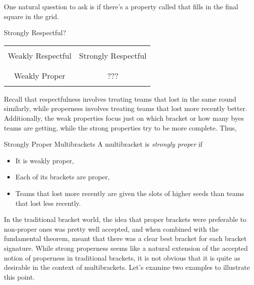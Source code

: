{    One natural question to ask is if there's a property called that fills in the final square in the grid.

    \begin{figg}{Strongly Respectful?}{}
        \begin{center}
            \begin{tabular}{ | c | c |}
            \hline
            & \\
            Weakly Respectful & Strongly Respectful\\
            & \\
            \hline
            & \\
            Weakly Proper & ??? \\
            & \\
            \hline
            \end{tabular}
        \end{center}
    \end{figg}

    Recall that respectfulness involves treating teams that lost in the same round similarly, while properness involves treating teams that lost more recently better. Additionally, the weak properties focus just on which bracket or how many byes teams are getting, while the strong properties try to be more complete. Thus,

    \begin{definition}{Strongly Proper Multibrackets}{}
        A multibracket is \textit{strongly proper} if
        \begin{itemize}
            \item It is weakly proper,
            \item Each of its brackets are proper,
            \item Teams that lost more recently are given the slots of higher seeds than teams that lost less recently.
        \end{itemize}
    \end{definition}

    In the traditional bracket world, the idea that proper brackets were preferable to non-proper ones was pretty well accepted, and when combined with the fundamental theorem, meant that there was a clear best bracket for each bracket signature. While strong properness seems like a natural extension of the accepted notion of properness in traditional brackets, it is not obvious that it is quite as desirable in the context of multibrackets. Let's examine two examples to illustrate this point.
    
}
